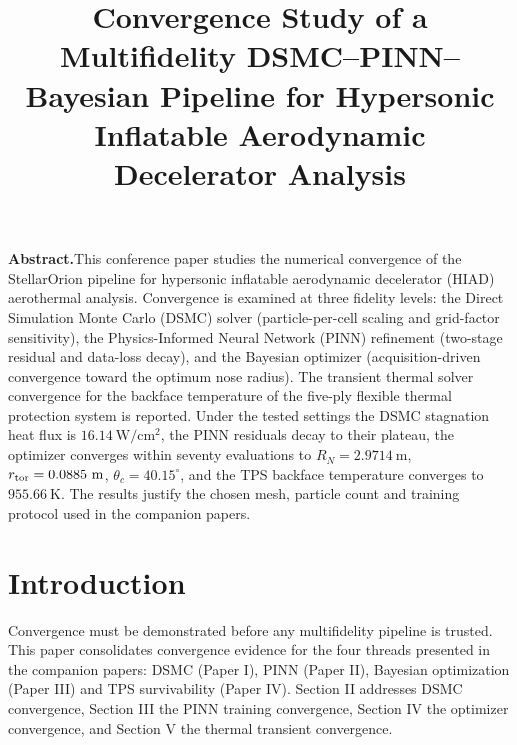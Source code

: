 \documentclass[conference]{IEEEtran}
\begin{document}
\title{Convergence Study of a Multifidelity DSMC--PINN--Bayesian Pipeline for Hypersonic Inflatable Aerodynamic Decelerator Analysis}

\author{
}

\maketitle

\noindent\textbf{Abstract.}\quad This conference paper studies the numerical convergence of the StellarOrion pipeline for hypersonic inflatable aerodynamic decelerator (HIAD) aerothermal analysis. Convergence is examined at three fidelity levels: the Direct Simulation Monte Carlo (DSMC) solver (particle-per-cell scaling and grid-factor sensitivity), the Physics-Informed Neural Network (PINN) refinement (two-stage residual and data-loss decay), and the Bayesian optimizer (acquisition-driven convergence toward the optimum nose radius). The transient thermal solver convergence for the backface temperature of the five-ply flexible thermal protection system is reported. Under the tested settings the DSMC stagnation heat flux is $16.14~\mathrm{W/cm^2}$, the PINN residuals decay to their plateau, the optimizer converges within seventy evaluations to $R_N=2.9714~\mathrm{m}$, $r_{\rm tor}=0.0885~\mathrm{m}$, $\theta_c=40.15^{\circ}$, and the TPS backface temperature converges to $955.66~\mathrm{K}$. The results justify the chosen mesh, particle count and training protocol used in the companion papers.
\par\vspace{0.5em}

\IEEEoverridecommandlockouts

\section{Introduction}
Convergence must be demonstrated before any multifidelity pipeline is trusted. This paper consolidates convergence evidence for the four threads presented in the companion papers: DSMC (Paper I), PINN (Paper II), Bayesian optimization (Paper III) and TPS survivability (Paper IV). Section II addresses DSMC convergence, Section III the PINN training convergence, Section IV the optimizer convergence, and Section V the thermal transient convergence.
\end{document}
